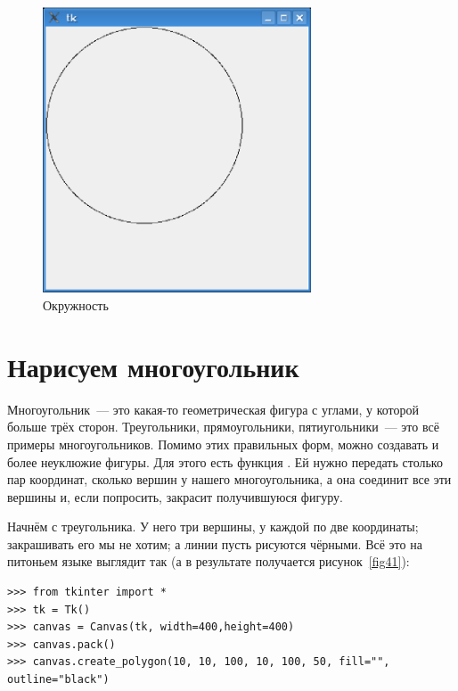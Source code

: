\begin{figure}
\begin{center}
\includegraphics[width=80mm]{../en/figure40.eps}
\end{center}
\caption{Окружность}\label{fig40}
\end{figure}

\section{Нарисуем многоугольник}

Многоугольник — это какая-то геометрическая фигура с углами, у которой больше трёх сторон. Треугольники, прямоугольники, пятиугольники — это всё примеры многоугольников. Помимо этих правильных форм, можно создавать и более неуклюжие фигуры. Для этого есть функция . Ей нужно передать столько пар координат, сколько вершин у нашего многоугольника, а она соединит все эти вершины и, если попросить, закрасит получившуюся фигуру.

Начнём с треугольника. У него три вершины, у каждой по две координаты; закрашивать его мы не хотим; а линии пусть рисуются чёрными. Всё это на питоньем языке выглядит так (а в результате получается рисунок \ref{fig41}):

\begin{listing}
\begin{verbatim}
>>> from tkinter import *
>>> tk = Tk()
>>> canvas = Canvas(tk, width=400,height=400)
>>> canvas.pack()
>>> canvas.create_polygon(10, 10, 100, 10, 100, 50, fill="", outline="black")
\end{verbatim}
\end{listing}

